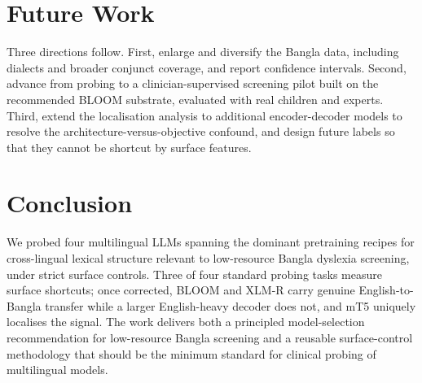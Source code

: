 \documentclass[conference]{IEEEtran}
\begin{document}
\section{Future Work}
Three directions follow. First, enlarge and diversify the Bangla data, including dialects and broader conjunct coverage, and report confidence intervals. Second, advance from probing to a clinician-supervised screening pilot built on the recommended BLOOM substrate, evaluated with real children and experts. Third, extend the localisation analysis to additional encoder-decoder models to resolve the architecture-versus-objective confound, and design future labels so that they cannot be shortcut by surface features.

\section{Conclusion}
We probed four multilingual LLMs spanning the dominant pretraining recipes for cross-lingual lexical structure relevant to low-resource Bangla dyslexia screening, under strict surface controls. Three of four standard probing tasks measure surface shortcuts; once corrected, BLOOM and XLM-R carry genuine English-to-Bangla transfer while a larger English-heavy decoder does not, and mT5 uniquely localises the signal. The work delivers both a principled model-selection recommendation for low-resource Bangla screening and a reusable surface-control methodology that should be the minimum standard for clinical probing of multilingual models.
\end{document}
